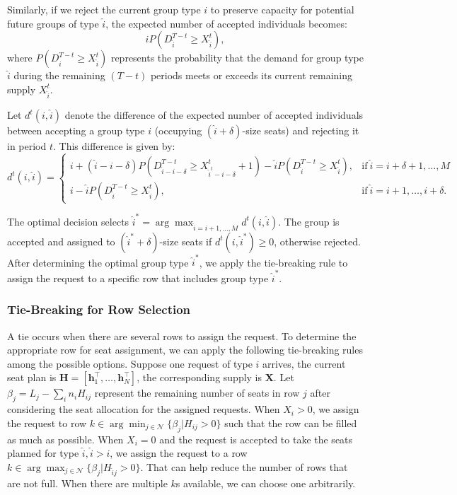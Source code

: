 Similarly, if we reject the current group type $i$ to preserve capacity for potential future groups of type $\hat{i}$, the expected number of accepted individuals becomes: $$\hat{i} P(D_{\hat{i}}^{T-t} \geq X_{\hat{i}}^{t}),$$ where $P(D_{\hat{i}}^{T-t} \geq X_{\hat{i}}^{t})$ represents the probability that the demand for group type $\hat{i}$ during the remaining $(T-t)$ periods meets or exceeds its current remaining supply $X_{\hat{i}}^{t}$.

Let $d^{t}({i},\hat{i})$ denote the difference of the expected number of accepted individuals between accepting a group type ${i}$ (occupying $(\hat{i}+\delta)$-size seats) and rejecting it in period $t$. This difference is given by:
\begin{equation*}
	d^{t}({i},\hat{i}) = \begin{cases}
    {i} + (\hat{i}-{i}-\delta)P(D_{\hat{i}-{i}-\delta}^{T-t} \geq X_{\hat{i}^{t}-{i}-\delta}^{t}+1) - \hat{i} P(D_{\hat{i}}^{T-t} \geq X_{\hat{i}}^{t}), &\text{if}~ \hat{i} = {i}+\delta+1, \ldots, M \\
    {i} - \hat{i} P(D_{\hat{i}}^{T-t} \geq X_{\hat{i}}^{t}), &\text{if}~ \hat{i} = {i}+1, \ldots, {i}+\delta.
		\end{cases}
\end{equation*}

The optimal decision selects $\hat{i}^{*} = \arg \max_{\hat{i} = {i}+1, \ldots, M} d^{t}({i},\hat{i})$. The group is accepted and assigned to $(\hat{i}^{*} + \delta)$-size seats if $d^{t}({i},\hat{i}^{*}) \geq 0$, otherwise rejected. After determining the optimal group type $\hat{i}^{*}$, we apply the tie-breaking rule to assign the request to a specific row that includes group type $\hat{i}^{*}$.


\subsubsection*{Tie-Breaking for Row Selection}\label{tie-break}
A tie occurs when there are several rows to assign the request. To determine the appropriate row for seat assignment, we can apply the following tie-breaking rules among the possible options. Suppose one request of type ${i}$ arrives, the current seat plan is $\bm{H} = [\bm{h}_{1}^{\intercal}, \ldots, \bm{h}_{N}^{\intercal}]$, the corresponding supply is $\bm{X}$. Let $\beta_{j} = L_j - \sum_{i} n_{i} H_{ij}$ represent the remaining number of seats in row $j$ after considering the seat allocation for the assigned requests. When $X_{i} > 0$, we assign the request to row $k \in \arg \min_{j \in \mathcal{N}} \{\beta_{j}|H_{ij} > 0\}$ such that the row can be filled as much as possible. When $X_{i} = 0$ and the request is accepted to take the seats planned for type $\hat{i}, \hat{i}>i$, we assign the request to a row $k \in \arg \max_{j \in \mathcal{N}} \{\beta_{j}| H_{\hat{i} j}>0\}$. That can help reduce the number of rows that are not full. When there are multiple $k$s available, we can choose one arbitrarily. 

